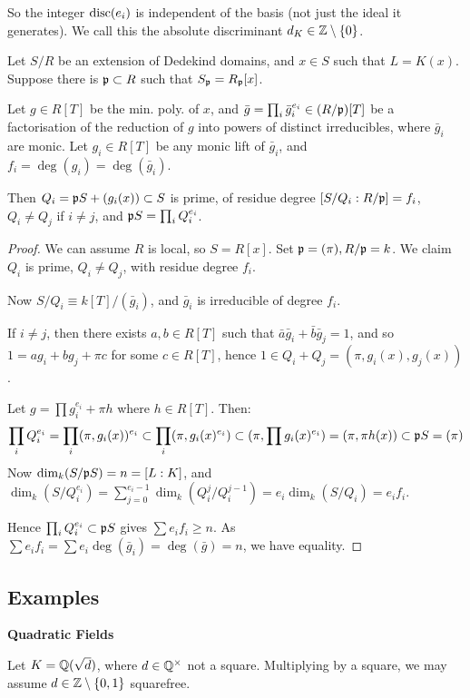 \documentclass[10pt,a4paper]{article}
\begin{document}
So the integer $\operatorname{disc}(e_i)$ is independent of the basis (not just the ideal it generates). We call this the absolute discriminant $d_K \in \mathbb{Z} \setminus \{0\}$.
\begin{theorem}
  Let $S/R$ be an extension of Dedekind domains, and $x \in S$ such that $L=K(x)$. Suppose there is $\mathfrak{p} \subset R$ such that $S_{\mathfrak{p}} = R_{\mathfrak{p}}[x]$.

  Let $g \in R[T]$ be the min. poly. of $x$, and $\bar{g} = \prod_i \bar{g}_i^{e_i} \in (R/\mathfrak{p})[T]$ be a factorisation of the reduction of $g$ into powers of distinct irreducibles, where $\bar{g}_i$ are monic. Let $g_i \in R[T]$ be any monic lift of $\bar{g}_i$, and $f_i = \deg(g_i) = \deg(\bar{g}_i)$.

  Then $Q_i= \mathfrak{p} S + (g_i(x)) \subset S$ is prime, of residue degree $[S/Q_i : R/\mathfrak{p}] = f_i$, $Q_i \neq Q_j$ if $i\neq j$, and $\mathfrak{p} S = \prod_i Q_i^{e_i}$.
\end{theorem}
\begin{proof}
  We can assume $R$ is local, so $S = R[x]$. Set $\mathfrak{p} = (\pi), R/\mathfrak{p} = k$. We claim $Q_i$ is prime, $Q_i \neq Q_j$, with residue degree $f_i$.

  Now $S/Q_i \equiv k[T]/(\bar{g}_i)$, and $\bar{g}_i$ is irreducible of degree $f_i$.

  If $i \neq j$, then there exists $a,b \in R[T]$ such that $\bar{a}\bar{g}_i + \bar{b}\bar{g}_j = 1$, and so $1 = ag_i + bg_j + \pi c$ for some $c \in R[T]$, hence $1 \in Q_i +Q_j = (\pi, g_i(x), g_j(x))$.

  Let $g = \prod g_i^{e_i} + \pi h$ where $h \in R[T]$. Then:
  \[\prod_i Q_i^{e_i} = \prod_i (\pi, g_i(x))^{e_i} \subset \prod_i (\pi, g_i(x)^{e_i}) \subset (\pi, \prod g_i(x)^{e_i}) = (\pi, \pi h(x)) \subset \mathfrak{p} S = (\pi)\]
  Now $\dim_k (S/\mathfrak{p} S) = n = [L:K]$, and $\dim_k(S/Q_i^{e_i}) = \sum_{j=0}^{e_i-1}\dim_k(Q_i^j/Q_i^{j-1}) = e_i \dim_k(S/Q_i) = e_i f_i$.

  Hence $\prod_i Q_i^{e_i} \subset \mathfrak{p} S$ gives $\sum e_i f_i \geq n$. As $\sum e_i f_i = \sum e_i \deg(\bar{g}_i) = \deg(\bar{g}) = n$, we have equality.
\end{proof}
\subsection{Examples}
\textbf{Quadratic Fields}

Let $K = \mathbb{Q}(\sqrt{d})$, where $d \in \mathbb{Q}^\times$ not a square. Multiplying by a square, we may assume $d \in \mathbb{Z}\setminus \{0,1\}$ squarefree.
\end{document}
